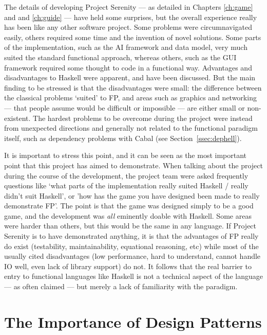 The details of developing Project Serenity --- as detailed in Chapters \ref{ch:game} and and \ref{ch:guide} --- have held some surprises, but the overall experience really has been like any other software project. Some problems were circumnavigated easily, others required some time and the invention of novel solutions. Some parts of the implementation, such as the AI framework and data model, very much suited the standard functional approach, whereas others, such as the GUI framework required some thought to code in a functional way. Advantages and disadvantages to Haskell were apparent, and have been discussed. But the main finding to be stressed is that the disadvantages were small: the difference between the classical problems `suited' to FP, and areas such as graphics and networking --- that people assume would be difficult or impossible --- are either small or non-existent. The hardest problems to be overcome during the project were instead from unexpected directions and generally not related to the functional paradigm itself, such as dependency problems with Cabal (see Section~\ref{ssec:dephell}).

It is important to stress this point, and it can be seen as the most important point that this project has aimed to demonstrate. When talking about the project during the course of the development, the project team were asked frequently questions like `what parts of the implementation really suited Haskell / really didn't suit Haskell', or 'how has the game you have designed been made to really demonstrate FP'. The point is that the game was designed simply to be a good game, and the development was \emph{all} eminently doable with Haskell. Some areas were harder than others, but this would be the same in any language. If Project Serenity is to have demonstrated anything, it is that the advantages of FP really do exist (testability, maintainability, equational reasoning, etc) while most of the usually cited disadvantages (low performance, hard to understand, cannot handle IO well, even lack of library support) do not. It follows that the real barrier to entry to functional languages like Haskell is not a technical aspect of the language --- as often claimed --- but merely a lack of familiarity with the paradigm.

\section{The Importance of Design Patterns}

